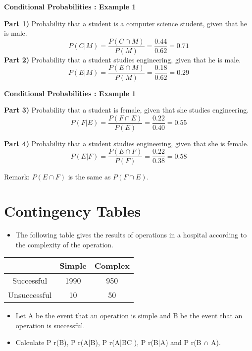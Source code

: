 \documentclass[]{report}
\begin{document}
{
	\noindent \textbf{Conditional Probabilities : Example 1}
	
	\textbf{Part 1)} Probability that a student is a computer science student, given that he is male.
	\[ P(C|M) = \frac{P(C \cap M)}{P(M)}  = \frac{0.44}{0.62} = 0.71 \]
	\textbf{Part 2)} Probability that a student studies engineering, given that he is male.
	\[ P(E|M) = \frac{P(E \cap M)}{P(M)}  = \frac{0.18}{0.62} = 0.29 \]
	
}

{
	\noindent \textbf{Conditional Probabilities : Example 1}
	
	\textbf{Part 3)} Probability that a student is female, given that she studies engineering.
	\[ P(F|E) = \frac{P(F \cap E)}{P(E)}  = \frac{0.22}{0.40} = 0.55 \]
	
	\textbf{Part 4)} Probability that a student studies engineering, given that she is female.
	\[ P(E|F) = \frac{P(E \cap F)}{P(F)}  = \frac{0.22}{0.38} = 0.58 \]
	
	
	Remark: $P(E \cap F)$ is the same as $P(F \cap E)$.
	
	
}

\section{Contingency Tables}

\begin{itemize}
				\item The following table gives the results of operations in a hospital according to the complexity of the
				operation.
			\end{itemize}
			
	\begin{center}
	
	\begin{tabular}{ccc}
			 & Simple & Complex \\ \hline
			 Successful & 1990 & 950 \\ \hline
			 Unsuccessful & 10 & 50\\ \hline
	\end{tabular} 	
	\end{center}	

			
			\begin{itemize}
				\item Let A be the event that an operation is simple and B be the event that an
				operation is successful. 
				\item Calculate P r(B), P r(A|B), P r(A|BC ), P r(B|A) and
				P r(B ∩ A). 
			\end{itemize}
\end{document}
